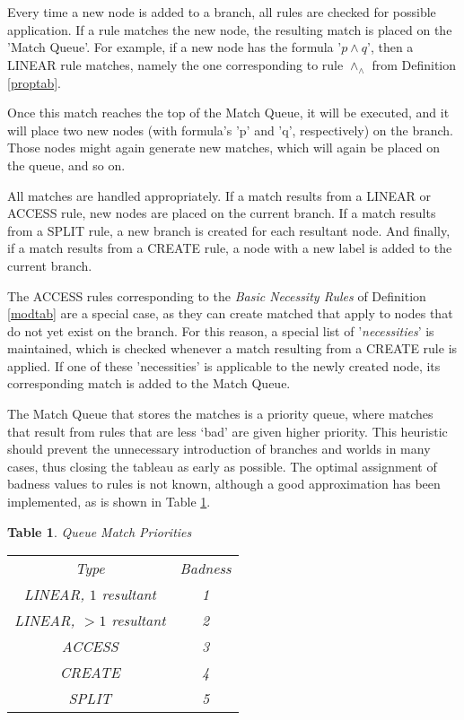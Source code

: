 \documentclass[11pt,a4paper]{article}
\newtheorem{mytable}{Table}[section]
\begin{document}
Every time a new node is added to a branch, all rules are checked for possible application. If a rule matches the new node, the resulting match is placed on the 'Match Queue'. For example, if a new node has the formula '$p \wedge q$', then a LINEAR rule matches, namely the one corresponding to rule $\wedge_{\wedge}$ from Definition \ref{proptab}.

Once this match reaches the top of the Match Queue, it will be executed, and it will place two new nodes (with formula's 'p' and 'q', respectively) on the branch. Those nodes might again generate new matches, which will again be placed on the queue, and so on.

All matches are handled appropriately. If a match results from a LINEAR or ACCESS rule, new nodes are placed on the current branch. If a match results from a SPLIT rule, a new branch is created for each resultant node. And finally, if a match results from a CREATE rule, a node with a new label is added to the current branch.

The ACCESS rules corresponding to the {\it Basic Necessity Rules} of Definition \ref{modtab} are a special case, as they can create matched that apply to nodes that do not yet exist on the branch. For this reason, a special list of '{\it necessities}' is maintained, which is checked whenever a match resulting from a CREATE rule is applied. If one of these 'necessities' is applicable to the newly created node, its corresponding match is added to the Match Queue.
\newline

The Match Queue that stores the matches is a priority queue, where matches that result from rules that are less `bad' are given higher priority. This heuristic should prevent the unnecessary introduction of branches and worlds in many cases, thus closing the tableau as early as possible. The optimal assignment of badness values to rules is not known, although a good approximation has been implemented, as is shown in Table \ref{prior}.


\newpage

\begin{mytable}{Queue Match Priorities}
\label{prior}
\newline
\newline
\begin{tabular}{cc}
{\it Type} & {\it Badness} \\
LINEAR, $1$ resultant & 1 \\
LINEAR, $> 1$ resultant  & 2 \\
ACCESS & 3 \\
CREATE & 4 \\
SPLIT & 5 \\
\end{tabular}
\end{mytable}
\end{document}
